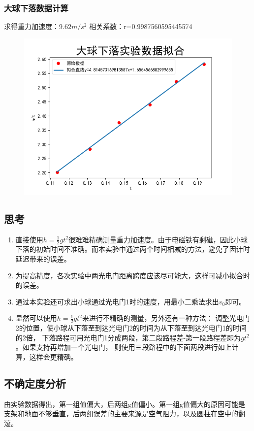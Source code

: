 \documentclass[UTF8]{ctexart}
\begin{document}
\subsubsection{大球下落数据计算}
求得重力加速度：$9.62m/s^2$
\newline 相关系数：r=0.9987560595445574
\begin{figure}[h]
\includegraphics[scale=0.7]{data3_r=0.9987560595445574.png}
\end{figure}
\newpage
\subsection*{思考}
\begin{enumerate}
    \item 直接使用$h=\frac{1}{2}gt^2$很难难精确测量重力加速度。由于电磁铁有剩磁，因此小球
    下落的初始时间不准确。而本实验中通过两个时间相减的方法，避免了因计时延迟带来的误差。
    \item 为提高精度，各次实验中两光电门距离跨度应该尽可能大，这样可减小拟合时的误差。
    \item 通过本实验还可求出小球通过光电门1时的速度，用最小二乘法求出$v_0$即可。
    \item 显然可以使用$h=\frac{1}{2}gt^2$来进行不精确的测量，另外还有一种方法：
    调整光电门2的位置，使小球从下落至到达光电门2的时间为从下落至到达光电门1的时间的2倍，
    下落路程可用光电门1分成两段，第二段路程差-第一段路程差即为$gt^2$。如果支持再增加一个光电门，
    则使用三段路程中的下面两段进行如上计算，这样会更精确。
\end{enumerate}
\subsection{不确定度分析}
由实验数据得出，第一组值偏大，后两组g值偏小。第一组g值偏大的原因可能是
支架和地面不够垂直，后两组误差的主要来源是空气阻力，以及圆柱在空中的翻滚。
\end{document}

